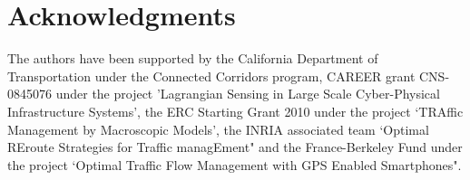 \section{Acknowledgments}\label{sec:ack}

The authors have been supported by the California Department of Transportation
under the Connected Corridors program, CAREER grant CNS-0845076 under the
project 'Lagrangian Sensing in Large Scale Cyber-Physical Infrastructure
Systems', the ERC Starting Grant 2010 under the project `TRAffic Management by
Macroscopic Models', the INRIA associated team `Optimal REroute Strategies for
Traffic managEment" and the France-Berkeley Fund under the project `Optimal
Traffic Flow Management with GPS Enabled Smartphones".